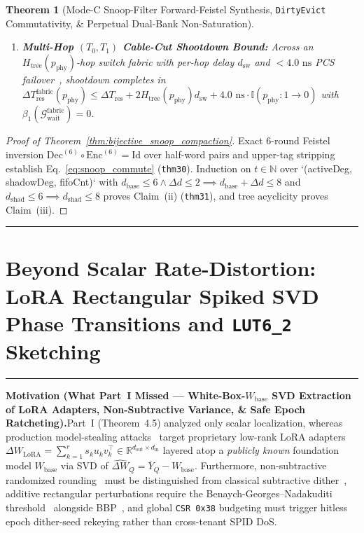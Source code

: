\documentclass[10pt,twocolumn]{article}
\makeatletter
\newif\ifspecintwocol \specintwocolfalse
\newif\ifspecresume   \specresumefalse
\newcommand{\StartTwoCol}{%
  \if@twocolumn
    \let\spec@next\@empty
  \else
    \ifspecintwocol
      \let\spec@next\@empty
    \else
      \global\specintwocoltrue
      \def\spec@next{\begin{multicols}{2}}%
    \fi
  \fi
  \spec@next
}
\newcommand{\StopTwoCol}{%
  \if@twocolumn
    \onecolumn
    \global\specintwocolfalse
    \let\spec@next\@empty
  \else
    \ifspecintwocol
      \global\specintwocolfalse
      \def\spec@next{\end{multicols}}%
    \else
      \let\spec@next\@empty
    \fi
  \fi
  \spec@next
}
\newcommand{\BeginConnesPlate}{%
  \if@twocolumn
    \onecolumn
    \global\specresumetrue
    \let\spec@platepre\@empty
  \else
    \ifspecintwocol
      \global\specresumetrue
      \let\spec@platepre\StopTwoCol
    \else
      \global\specresumefalse
      \let\spec@platepre\@empty
    \fi
  \fi
  \spec@platepre
  \par\vspace{4pt}\noindent\textcolor{black!25}{\rule{\textwidth}{0.4pt}}\par\vspace{3pt}%
}
\newcommand{\EndConnesPlate}{%
  \par\vspace{3pt}\noindent\textcolor{black!25}{\rule{\textwidth}{0.4pt}}\par\vspace{4pt}%
  \ifspecresume
    \global\specresumefalse
    \let\spec@platepost\StartTwoCol
  \else
    \let\spec@platepost\@empty
  \fi
  \spec@platepost
}
\theoremstyle{spectralthm}
\newtheorem{theorem}{Theorem}[section]
\makeatother
\begin{document}
\begin{theorem}[Mode-C Snoop-Filter Forward-Feistel Synthesis, \texttt{DirtyEvict} Commutativity, \& Perpetual Dual-Bank Non-Saturation]
\begin{enumerate}
  \item[(iii)] \textbf{Multi-Hop $(T_0, T_1)$ Cable-Cut Shootdown Bound:} Across an $H_{\mathrm{tree}}(p_{\mathrm{phy}})$-hop switch fabric with per-hop delay $d_{\mathrm{sw}}$ and $<4.0\text{~ns}$ PCS failover~\cite{ucie2025spec30}, shootdown completes in $\Delta T_{\mathrm{res}}^{\mathrm{fabric}}(p_{\mathrm{phy}}) \le \Delta T_{\mathrm{res}} + 2 H_{\mathrm{tree}}(p_{\mathrm{phy}}) d_{\mathrm{sw}} + 4.0\text{~ns}\cdot\mathbb{I}(p_{\mathrm{phy}}:1\to 0)$ with $\beta_1(\mathcal{G}_{\mathrm{wait}}^{\mathrm{fabric}}) = 0$.
\end{enumerate}
\end{theorem}
\begin{proof}[Proof of Theorem~\ref{thm:bijective_snoop_compaction}]
Exact 6-round Feistel inversion $\mathrm{Dec}^{(6)} \circ \mathrm{Enc}^{(6)} = \mathrm{Id}$ over half-word pairs and upper-tag stripping establish Eq.~\eqref{eq:snoop_commute} (\texttt{thm30}). Induction on $t \in \mathbb{N}$ over `(activeDeg, shadowDeg, fifoCnt)` with $d_{\mathrm{base}} \le 6 \wedge \Delta d \le 2 \implies d_{\mathrm{base}} + \Delta d \le 8$ and $d_{\mathrm{shad}} \le 6 \implies d_{\mathrm{shad}} \le 8$ proves Claim~(ii) (\texttt{thm31}), and tree acyclicity proves Claim~(iii).
\end{proof}
\EndConnesPlate

\section{Beyond Scalar Rate-Distortion: LoRA Rectangular Spiked SVD Phase Transitions and \texorpdfstring{\texttt{LUT6\_2}}{LUT6\_2} Sketching}
\label{sec:spectral_sketch}

\BeginConnesPlate
\noindent\textbf{Motivation (What Part~I Missed --- White-Box-$W_{\mathrm{base}}$ SVD Extraction of LoRA Adapters, Non-Subtractive Variance, \& Safe Epoch Ratcheting).}\;Part~I (Theorem~4.5) analyzed only scalar localization, whereas production model-stealing attacks~\cite{carlini2024stealing,xu2024dataenclave} target proprietary low-rank LoRA adapters~\cite{hu2022lora} $\Delta W_{\mathrm{LoRA}} = \sum_{k=1}^r s_k u_k v_k^\top \in \mathbb{R}^{d_{\mathrm{out}} \times d_{\mathrm{in}}}$ layered atop a \emph{publicly known} foundation model $W_{\mathrm{base}}$ via SVD of $\widehat{\Delta W}_Q = \overline{Y}_Q - W_{\mathrm{base}}$. Furthermore, non-subtractive randomized rounding~\cite{wannamaker2000nonsubtractive} must be distinguished from classical subtractive dither~\cite{schuchman1964dither,gray1993dithered}, additive rectangular perturbations require the Benaych-Georges--Nadakuditi threshold~\cite{benaych2012singular} alongside BBP~\cite{marchenko1967distribution,baik2005phase,gavish2014optimal}, and global \texttt{CSR 0x38} budgeting must trigger hitless epoch dither-seed rekeying rather than cross-tenant SPID DoS.
\end{document}
